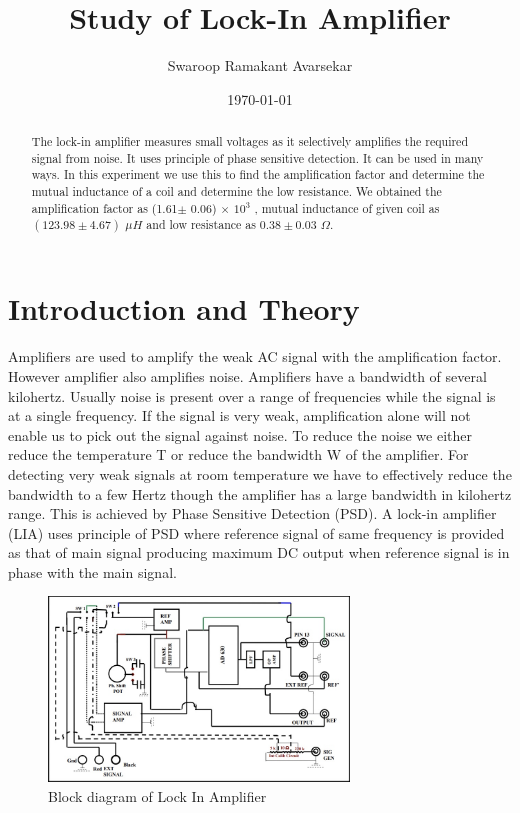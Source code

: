 \documentclass[a4paper, amsfonts, amssymb, amsmath, reprint, showkeys, nofootinbib, twoside]{revtex4-1}
\begin{document}
\title{Study of Lock-In Amplifier}
\author{Swaroop Ramakant Avarsekar}
\date{\today}

	
\begin{abstract}
The lock-in amplifier measures small voltages as it selectively amplifies the required signal from noise. It uses principle of phase sensitive detection. It can be used in many ways. In this experiment we use this to find the amplification factor and determine the mutual inductance of a coil and determine the low resistance.  We obtained the amplification factor as (1.61$\pm$ 0.06) $\times$ $10^3$ , mutual inductance of given coil as $(123.98\pm4.67)$ $\mu H$ and low resistance as $0.38\pm0.03$ $\Omega$.
\end{abstract}
	
	
\maketitle

\section{Introduction and Theory}
Amplifiers are used to amplify the weak AC signal with the amplification factor. However amplifier also amplifies noise. Amplifiers have a bandwidth of several kilohertz. Usually noise is present over a
range of frequencies while the signal is at a single frequency. If the signal is very weak,
amplification alone will not enable us to pick out the signal against noise. To reduce the noise we either reduce the temperature T or reduce the bandwidth W of the amplifier. For detecting very weak signals at room temperature we have to effectively reduce the bandwidth to a few Hertz though the amplifier has a large bandwidth in kilohertz range. This is achieved by Phase Sensitive Detection (PSD). A lock-in amplifier (LIA) uses principle of PSD where reference signal of same frequency is provided as that of main signal producing maximum DC output when reference signal is in phase with the main signal.

\begin{figure}[h]
	\centering
	\includegraphics[width=8cm]{f2} 
	\caption{Block diagram of Lock In Amplifier}
	\label{f2}
\end{figure}
\end{document}
